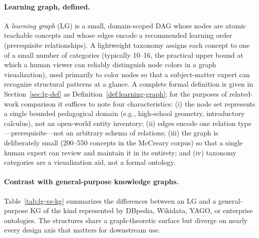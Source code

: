 \paragraph{Learning graph, defined.}
A \emph{learning graph} (LG) is a small, domain-scoped DAG whose nodes are
atomic teachable concepts and whose edges encode a recommended learning
order (prerequisite relationships). A lightweight taxonomy assigns each
concept to one of a small number of categories (typically 10--16, the
practical upper bound at which a human viewer can reliably distinguish
node colors in a graph visualization), used primarily to color nodes so
that a subject-matter expert can recognize structural patterns at a
glance. A complete formal
definition is given in Section~\ref{sec:lg-def} as
Definition~\ref{def:learning-graph}; for the purposes of related-work
comparison it suffices to note four characteristics: (i) the node set
represents a single bounded pedagogical domain (e.g., high-school geometry,
introductory calculus), not an open-world entity inventory; (ii) edges
encode one relation type---prerequisite---not an arbitrary schema of
relations; (iii) the graph is deliberately small (200--550 concepts in the
McCreary corpus) so that a single human expert can review and maintain it
in its entirety; and (iv) taxonomy categories are a visualization aid,
not a formal ontology.

\paragraph{Contrast with general-purpose knowledge graphs.}
Table~\ref{tab:lg-vs-kg} summarizes the differences between an LG and a
general-purpose KG of the kind represented by DBpedia, Wikidata, YAGO, or
enterprise ontologies. The structures share a graph-theoretic surface but
diverge on nearly every design axis that matters for downstream use.

